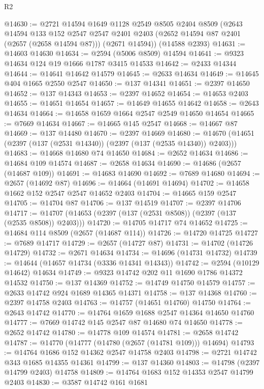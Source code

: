 \begin{lexlean}{R2}
\begin{coremodule}
@14630 := @2721
    @14594
    @1649
    @1128
    @2549
    @8505
    @2404
    @8509
    (@2643
      @14594
      @133
      @152
      @2547
      @2547
      @2401
      @2403
      (@2652 @14594 @87 @2401 (@2657 (@2658 @14594 @87)))
      (@2671 @14594))
    (@14588 @2393)
@14631 := @14603 @14630
@14634 := @2594 (@5006 @8509) @14594
@14641 := @9323 @14634 @124 @19 @1666 @1787 @3415 @14533
@14642 := @2433 @14344
@14644 := @14641 @14642 @14579
@14645 := @2633 @14634
@14649 := @14645 @404 @1665 @2550 @2547
@14650 := @137 @14341
@14651 := @2397 @14650
@14652 := @137 @14343
@14653 := @2397 @14652
@14654 := @14653 @2403
@14655 := @14651 @14654
@14657 := @14649 @14655 @14642
@14658 := @2643 @14634
@14664 := @14658 @1659 @1664 @2547 @2549 @14650 @14654
@14665 := @7669 @14634
@14667 := @14665 @145 @2547
@14668 := @14667 @87
@14669 := @137 @14480
@14670 := @2397 @14669
@14680 := @14670 (@14651 (@2397 (@137 (@2531 @14340)) (@2397 (@137 (@2535 @14340)) @2403)))
@14683 := @14668 @14680 @74 @14650
@14684 := @2652 @14634
@14686 := @14684 @109 @14574
@14687 := @2658 @14634
@14690 := @14686 (@2657 (@14687 @109))
@14691 := @14683 @14690
@14692 := @7689 @14680
@14694 := @2657 (@14692 @87)
@14696 := @14664 (@14691 @14694)
@14702 := @14658 @1662 @152 @2547 @2547 @14652 @2403
@14704 := @14665 @159 @2547
@14705 := @14704 @87
@14706 := @137 @14519
@14707 := @2397 @14706
@14717 := @14707 (@14653 (@2397 (@137 (@2531 @8508)) (@2397 (@137 (@2535 @8508)) @2403)))
@14720 := @14705 @14717 @74 @14652
@14725 := @14684 @114 @8509 (@2657 (@14687 @114))
@14726 := @14720 @14725
@14727 := @7689 @14717
@14729 := @2657 (@14727 @87)
@14731 := @14702 (@14726 @14729)
@14732 := @2671 @14634
@14734 := @14696 (@14731 @14732)
@14739 := @14644 (@14657 @14734 (@3336 @14341 @14343))
@14742 := @2594 (@10129 @14642) @14634
@14749 := @9323 @14742 @202 @11 @1690 @1786 @14372 @14532
@14750 := @137 @14369
@14752 := @14749 @14750 @14579
@14757 := @2633 @14742 @924 @1689 @14365 @14371
@14758 := @137 @14368
@14760 := @2397 @14758 @2403
@14763 := @14757 (@14651 @14760) @14750
@14764 := @2643 @14742
@14770 := @14764 @1659 @1688 @2547 @14364 @14650 @14760
@14777 := @7669 @14742 @145 @2547 @87 @14680 @74 @14650
@14778 := @2652 @14742
@14780 := @14778 @109 @14574
@14781 := @2658 @14742
@14787 := @14770 (@14777 (@14780 (@2657 (@14781 @109))) @14694)
@14793 := @14764 @1686 @152 @14362 @2547 @14758 @2403
@14798 := @2721 @14742 @343 @1685 @14355 @14361
@14799 := @137 @14360
@14803 := @14798 (@2397 @14799 @2403) @14758
@14809 := @14764 @1683 @152 @14353 @2547 @14799 @2403
@14830 := @3587
    @14742
    @161
    @1681

\end{coremodule}
\end{lexlean}
